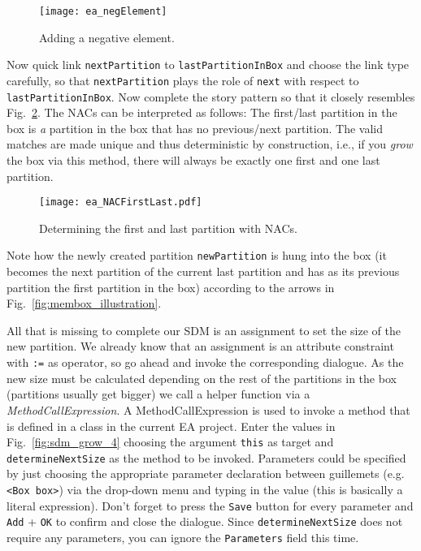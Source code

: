 \begin{figure}[htbp]
\begin{center}
  \texttt{[image: ea\_negElement]}
  \caption{Adding a negative element.}  
  \label{fig:sdm_grow_2}
\end{center}
\end{figure}
 
Now quick link \texttt{nextPartition} to \texttt{lastPartitionInBox} and choose the link type carefully, so that \texttt{nextPartition} plays the role of
\texttt{next} with respect to \texttt{lastPartitionInBox}. Now complete the story pattern so that it closely resembles Fig.~\ref{fig:sdm_grow_3}. The
\mbox{NACs} can be interpreted as follows:  The first/last partition in the box is \emph{a} partition in the box that has no previous/next partition.
The valid matches are made unique and thus deterministic by construction, i.e., if you \emph{grow} the box via this method, there will always be exactly one
first and one last partition.

\begin{figure}[htbp]
\begin{center}
  \texttt{[image: ea\_NACFirstLast.pdf]} 
  \caption{Determining the first and last partition with NACs.}  
  \label{fig:sdm_grow_3}
\end{center}
\end{figure}
 
Note how the newly created partition \texttt{newPartition} is hung into the box (it becomes the next partition of the current last partition and has as its
previous partition the first partition in the box) according to the arrows in Fig.~\ref{fig:membox_illustration}.
  
All that is missing to complete our SDM is an assignment to set the size of the new partition. We already know that an assignment is an attribute constraint
with \texttt{:=} as operator, so go ahead and invoke the corresponding dialogue. As the new size must be calculated depending on the rest of the partitions in
the box (partitions usually get bigger) we call a helper function  via a \emph{MethodCallExpression}. A MethodCallExpression is used
to invoke a method that is defined in a class in the current EA project. Enter the values in Fig.~\ref{fig:sdm_grow_4} choosing the argument \texttt{this} as
target and \texttt{determineNextSize} as the method to be invoked.
Parameters could be specified by just choosing the appropriate parameter declaration between guillemets (e.g. \texttt{<Box box>}) via the drop-down menu and
typing in the value (this is basically a literal expression). Don't forget to press the \texttt{Save} button for every parameter and \texttt{Add} + \texttt{OK}
to confirm and close the dialogue. Since \texttt{determineNextSize} does not require any parameters, you can ignore the \texttt{Parameters} field this time.
 
